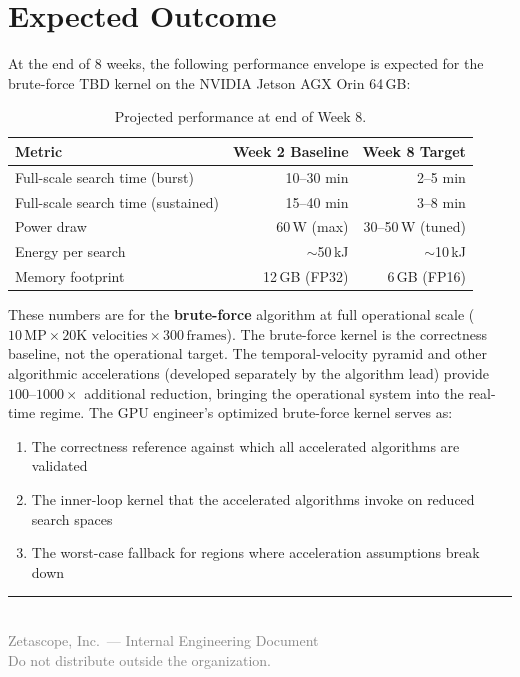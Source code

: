 \documentclass[11pt,letterpaper]{article}
\begin{document}
\section{Expected Outcome}

At the end of 8 weeks, the following performance envelope is expected for
the brute-force TBD kernel on the NVIDIA Jetson AGX Orin 64\,GB:

\begin{table}[h]
\centering
\caption{Projected performance at end of Week 8.}
\begin{tabular}{@{}lrr@{}}
\toprule
\textbf{Metric} & \textbf{Week 2 Baseline} & \textbf{Week 8 Target} \\
\midrule
Full-scale search time (burst)    & 10--30 min  & 2--5 min \\
Full-scale search time (sustained)& 15--40 min  & 3--8 min \\
Power draw                        & 60\,W (max) & 30--50\,W (tuned) \\
Energy per search                 & $\sim$50\,kJ & $\sim$10\,kJ \\
Memory footprint                  & 12\,GB (FP32) & 6\,GB (FP16) \\
\bottomrule
\end{tabular}
\end{table}

\begin{warnbox}
These numbers are for the \textbf{brute-force} algorithm at full
operational scale ($10\,\text{MP} \times 20\text{K velocities} \times
300\,\text{frames}$). The brute-force kernel is the correctness baseline,
not the operational target. The temporal-velocity pyramid and other
algorithmic accelerations (developed separately by the algorithm lead)
provide $100$--$1000\times$ additional reduction, bringing the operational
system into the real-time regime. The GPU engineer's optimized brute-force
kernel serves as:

\begin{enumerate}[leftmargin=2em]
    \item The correctness reference against which all accelerated
    algorithms are validated
    \item The inner-loop kernel that the accelerated algorithms invoke
    on reduced search spaces
    \item The worst-case fallback for regions where acceleration
    assumptions break down
\end{enumerate}
\end{warnbox}

\vfill
\begin{center}
\rule{0.5\textwidth}{0.4pt}\\[0.5em]
{\small\textcolor{gray}{%
    Zetascope, Inc.\ --- Internal Engineering Document\\
    Do not distribute outside the organization.
}}
\end{center}
\end{document}

